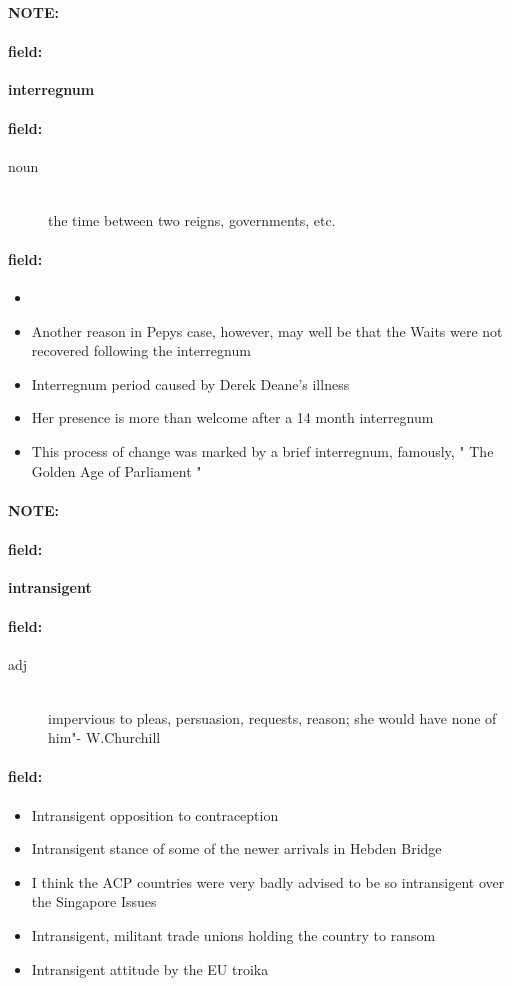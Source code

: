 \documentclass[12pt]{article}
\newenvironment{note}{\paragraph{NOTE:}}{}
\newenvironment{field}{\paragraph{field:}}{}
\begin{document}
\begin{note}
\begin{field}
\textbf{\large interregnum}
\end{field}


\begin{field}
\begin{description}
\item[noun] \hfill \\ 
the time between two reigns, governments, etc.

\end{description}
\end{field}

\begin{field}
\begin{itemize}
\item 
\item Another reason in Pepys case, however, may well be that the Waits were not recovered following the interregnum
\item Interregnum period caused by Derek Deane's illness
\item Her presence is more than welcome after a 14 month interregnum
\item This process of change was marked by a brief interregnum, famously, " The Golden Age of Parliament " 
\end{itemize}
\end{field}
\end{note}
\begin{note}
\begin{field}
\textbf{\large intransigent}
\end{field}


\begin{field}
\begin{description}
\item[adj] \hfill \\ 
impervious to pleas, persuasion, requests, reason; she would have none of him"- W.Churchill

\end{description}
\end{field}

\begin{field}
\begin{itemize}
\item Intransigent opposition to contraception
\item Intransigent stance of some of the newer arrivals in Hebden Bridge
\item I think the ACP countries were very badly advised to be so intransigent over the Singapore Issues
\item Intransigent, militant trade unions holding the country to ransom
\item Intransigent attitude by the EU troika
\end{itemize}
\end{field}
\end{note}
\end{document}
